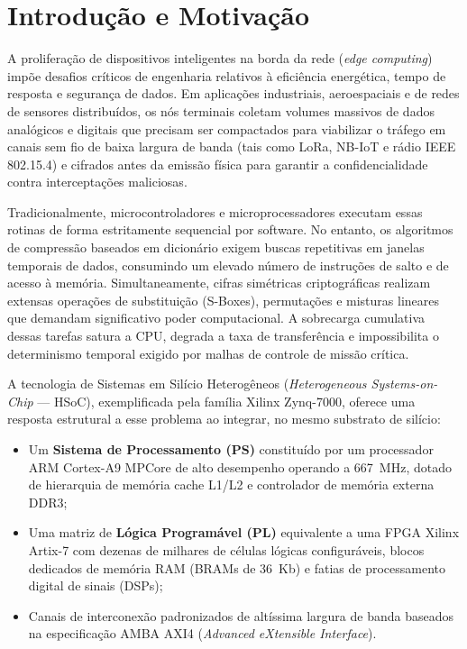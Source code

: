 \documentclass[11pt,a4paper]{article}
\begin{document}
\newpage
\tableofcontents
\newpage

\section{Introdução e Motivação}

A proliferação de dispositivos inteligentes na borda da rede (\textit{edge computing}) impõe desafios críticos de engenharia relativos à eficiência energética, tempo de resposta e segurança de dados. Em aplicações industriais, aeroespaciais e de redes de sensores distribuídos, os nós terminais coletam volumes massivos de dados analógicos e digitais que precisam ser compactados para viabilizar o tráfego em canais sem fio de baixa largura de banda (tais como LoRa, NB-IoT e rádio IEEE 802.15.4) e cifrados antes da emissão física para garantir a confidencialidade contra interceptações maliciosas.

Tradicionalmente, microcontroladores e microprocessadores executam essas rotinas de forma estritamente sequencial por software. No entanto, os algoritmos de compressão baseados em dicionário exigem buscas repetitivas em janelas temporais de dados, consumindo um elevado número de instruções de salto e de acesso à memória. Simultaneamente, cifras simétricas criptográficas realizam extensas operações de substituição (S-Boxes), permutações e misturas lineares que demandam significativo poder computacional. A sobrecarga cumulativa dessas tarefas satura a CPU, degrada a taxa de transferência e impossibilita o determinismo temporal exigido por malhas de controle de missão crítica.

A tecnologia de Sistemas em Silício Heterogêneos (\textit{Heterogeneous Systems-on-Chip} --- HSoC), exemplificada pela família Xilinx Zynq-7000, oferece uma resposta estrutural a esse problema ao integrar, no mesmo substrato de silício:
\begin{itemize}
  \item Um \textbf{Sistema de Processamento (PS)} constituído por um processador ARM Cortex-A9 MPCore de alto desempenho operando a 667~MHz, dotado de hierarquia de memória cache L1/L2 e controlador de memória externa DDR3;
  \item Uma matriz de \textbf{Lógica Programável (PL)} equivalente a uma FPGA Xilinx Artix-7 com dezenas de milhares de células lógicas configuráveis, blocos dedicados de memória RAM (BRAMs de 36~Kb) e fatias de processamento digital de sinais (DSPs);
  \item Canais de interconexão padronizados de altíssima largura de banda baseados na especificação AMBA AXI4 (\textit{Advanced eXtensible Interface}).
\end{itemize}
\end{document}
